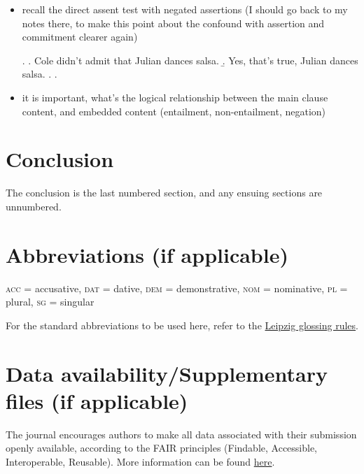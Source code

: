 \documentclass[times,linguex,xcolor]{glossa}
\begin{document}
\begin{itemize}
\begin{itemize}
        \item recall the direct assent test with negated assertions (I should go back to my notes there, to make this point about the confound with assertion and commitment clearer again)

        \ex. \a. Cole didn't admit that Julian dances salsa.
          \b. Yes, that's true, Julian dances salsa.
          \z.
        \z. 

        \item it is important, what's the logical relationship between the main clause content, and embedded content (entailment, non-entailment, negation)

      \end{itemize}

    \end{itemize}


\section{Conclusion \label{sec:5_conclusion}}

The conclusion is the last numbered section, and any ensuing sections are unnumbered.

\pagebreak
\section*{Abbreviations (if applicable)}\label{abbrev}

\textsc{acc} = accusative, \textsc{dat} = dative, \textsc{dem} = demonstrative, \textsc{nom} = nominative, \textsc{pl} = plural, \textsc{sg} = singular

For the standard abbreviations to be used here, refer to the \href{https://www.eva.mpg.de/lingua/resources/glossing-rules.php}{Leipzig glossing rules}.

\section*{Data availability/Supplementary files (if applicable)}

The journal encourages authors to make all data associated with their submission openly available, according to the FAIR principles (Findable, Accessible, Interoperable, Reusable). More information can be found \href{https://www.glossa-journal.org/site/editorial-policies/#data-policy}{here}.
\end{document}

